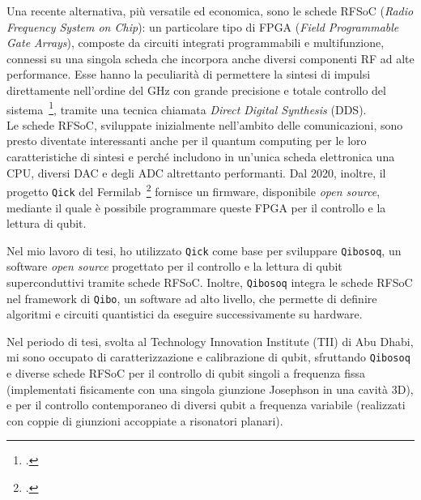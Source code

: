\documentclass{article}
\newcommand{\Qibo}{\texttt{Qibo}\xspace}
\newcommand{\Qibosoq}{\texttt{Qibosoq}\xspace}
\newcommand{\Qick}{\texttt{Qick}\xspace}
\begin{document}
Una recente alternativa, più versatile ed economica, sono le schede RFSoC (\textit{Radio Frequency System on Chip}): un particolare tipo di FPGA (\textit{Field Programmable Gate Arrays}), composte da circuiti integrati programmabili e multifunzione, connessi su una singola scheda che incorpora anche diversi componenti RF ad alte performance.
Esse hanno la peculiarità di permettere la sintesi di impulsi direttamente nell'ordine del GHz con grande precisione e totale controllo del sistema~\footcite{Kalfus2020}, tramite una tecnica chiamata \textit{Direct Digital Synthesis} (DDS).\\
%
Le schede RFSoC, sviluppate inizialmente nell'ambito delle comunicazioni, sono presto diventate interessanti anche per il quantum computing per le loro caratteristiche di sintesi e perché includono in un'unica scheda elettronica una CPU, diversi DAC e degli ADC altrettanto performanti.
Dal 2020, inoltre, il progetto \Qick del Fermilab~\footcite{Stefanazzi2022} fornisce un firmware, disponibile \textit{open source}, mediante il quale è possibile programmare queste FPGA per il controllo e la lettura di qubit.

Nel mio lavoro di tesi, ho utilizzato \Qick come base per sviluppare \Qibosoq, un software \textit{open source} progettato per il controllo e la lettura di qubit superconduttivi tramite schede RFSoC.
%
Inoltre, \Qibosoq integra le schede RFSoC nel framework di \Qibo, un software ad alto livello, che permette di definire algoritmi e circuiti quantistici da eseguire successivamente su hardware.

Nel periodo di tesi, svolta al Technology Innovation Institute (TII) di Abu Dhabi, mi sono occupato di caratterizzazione e calibrazione di qubit, sfruttando \Qibosoq e diverse schede RFSoC per il controllo di qubit singoli a frequenza fissa (implementati fisicamente con una singola giunzione Josephson in una cavità 3D), e per il controllo contemporaneo di diversi qubit a frequenza variabile (realizzati con coppie di giunzioni accoppiate a risonatori planari).
\end{document}

